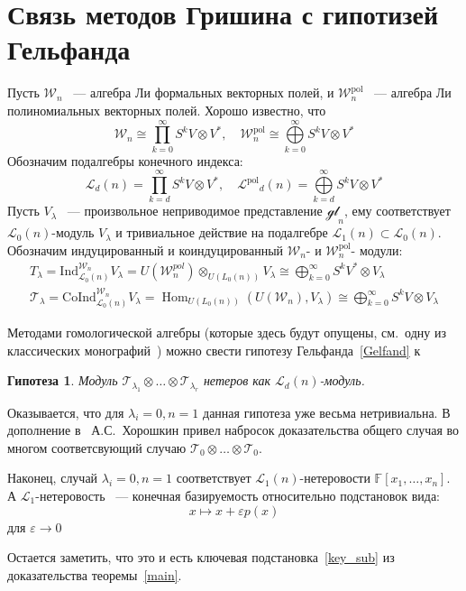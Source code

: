 \documentclass[12pt,a4paper]{article}
\newtheorem{conjecture}{Гипотеза}[section]
\newcommand{\Wpn}{\ensuremath{\mathcal{W}^{\mathrm{pol}}_n}}
\newcommand{\Wn}{\ensuremath{\mathcal{W}_n}}
\newcommand{\Lp}{\ensuremath{\mathcal{L}^{\mathrm{pol}}}}
\renewcommand{\L}{\ensuremath{\mathcal{L}}}
\begin{document}
    \section{Связь методов Гришина с гипотизей Гельфанда}
    Пусть $\Wn$ ~--- алгебра Ли формальных векторных полей, и $\Wpn$ ~--- алгебра Ли полиномиальных векторных полей.
    Хорошо известно, что
    \[
        \Wn \cong \prod\limits_{k=0}^{\infty} S^k V\otimes V^*, \quad \Wpn \cong \bigoplus\limits_{k=0}^{\infty} S^k V\otimes V^*
    \]
    Обозначим подалгебры конечного индекса:
    \[
        \L_d(n) = \prod\limits_{k=d}^{\infty} S^k V\otimes V^*, \quad \Lp_d(n) = \bigoplus\limits_{k=d}^{\infty} S^k V\otimes V^*
    \]
    Пусть $V_{\lambda}$ ~--- произвольное неприводимое представление $\mathcal{gl}_n$, ему соответствует $\L_0(n)$-модуль $V_{\lambda}$ и тривиальное действие на подалгебре $\L_1(n)\subset\L_0(n)$.
    Обозначим индуцированный и коиндуцированный $\Wn$- и $\Wpn$- модули:
    \begin{gather*}
        T_{\lambda} = \mathrm{Ind}^{\Wn}_{\L_0(n)} V_{\lambda} =  U(\mathcal{W}_n^{pol}) \otimes_{U(L_0(n))} V_{\lambda} \cong \bigoplus_{k=0}^{\infty} S^k V^* \otimes V_{\lambda} \\
        \mathcal{T}_{\lambda} = \mathrm{CoInd}^{\Wn}_{\L_0(n)} V_{\lambda} = \operatorname{Hom}_{U(L_0(n))}(U(\mathcal{W}_n), V_{\lambda}) \cong \bigoplus_{k=0}^{\infty} S^k V \otimes V_{\lambda}
    \end{gather*}

    Методами гомологической алгебры (которые здесь будут опущены, см.\ одну из классических монографий~\cite{Fuks}) можно свести гипотезу Гельфанда~\ref{Gelfand} к

    \vskip 0.1in\noindent
    \begin{conjecture}
        Модуль $\mathcal{T}_{\lambda_1}\otimes\ldots\otimes\mathcal{T}_{\lambda_r}$ нетеров как $\L_d(n)$-модуль.
    \end{conjecture}
    \vskip 0.1in\noindent

    Оказывается, что для $\lambda_i=0, n=1$ данная гипотеза уже весьма нетривиальна.
    В дополнение в~\cite{Feigin-Kanel-Khoroshkin} А.С.\ Хорошкин привел набросок доказательства общего случая во многом соответсвующий случаю $\mathcal{T}_{0}\otimes\ldots\otimes\mathcal{T}_{0}$.

    Наконец, случай $\lambda_i=0, n=1$ соответствует $\L_1(n)$-нетеровости $\mathbb{F}[x_1, \ldots, x_n]$.
    А $\L_1$-нетеровость ~--- конечная базируемость относительно подстановок вида:
    \[
        x \mapsto x + \varepsilon p(x)
    \]
    для $\varepsilon\to 0$

    Остается заметить, что это и есть ключевая подстановка~\ref{key_sub} из доказательства теоремы~\ref{main}.

    \printbibliography
\end{document}
